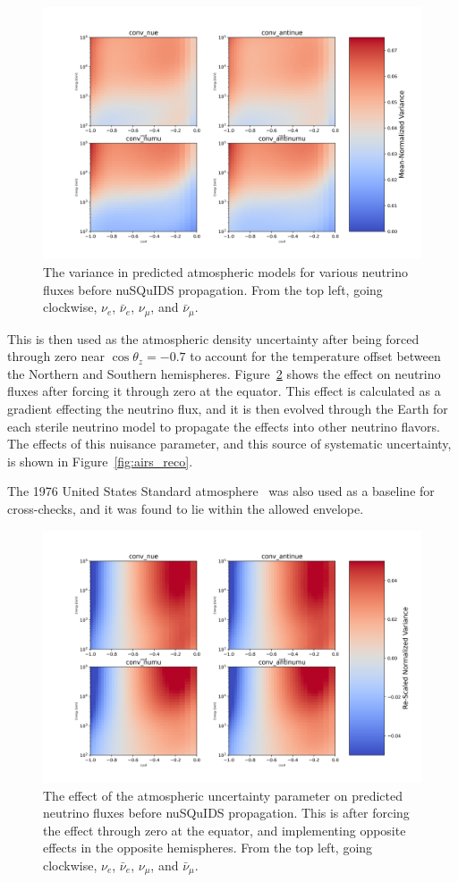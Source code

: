 \documentclass[main.tex]{subfiles}
\begin{document}
\begin{figure}
    \centering
    \includegraphics[width=0.8\linewidth]{figures/airs_grid_var.png}
    \caption{The variance in predicted atmospheric models for various neutrino fluxes before nuSQuIDS propagation. From the top left, going clockwise, $\nu_{e}$, $\bar{\nu}_{e}$, $\nu_{\mu}$, and $\bar{\nu}_{\mu}$. }\label{fig:airs_raw}
\end{figure}

This is then used as the atmospheric density uncertainty after being forced through zero near $\cos\theta_{z}=-0.7$ to account for the temperature offset between the Northern and Southern hemispheres. 
Figure~\ref{fig:airs_grid} shows the effect on neutrino fluxes after forcing it through zero at the equator.
This effect is calculated as a gradient effecting the neutrino flux, and it is then evolved through the Earth for each sterile neutrino model to propagate the effects into other neutrino flavors. 
The effects of this nuisance parameter, and this source of systematic uncertainty, is shown in Figure~\ref{fig:airs_reco}.

The 1976 United States Standard atmosphere~\cite{united1976u} was also used as a baseline for cross-checks, and it was found to lie within the allowed envelope. 

\begin{figure}
    \centering
    \includegraphics[width=0.8\linewidth]{figures/airs_grid.png}
    \caption{The effect of the atmospheric uncertainty parameter on predicted neutrino fluxes before nuSQuIDS propagation. This is after forcing the effect through zero at the equator, and implementing opposite effects in the opposite hemispheres. From the top left, going clockwise, $\nu_{e}$, $\bar{\nu}_{e}$, $\nu_{\mu}$, and $\bar{\nu}_{\mu}$.}\label{fig:airs_grid}
\end{figure}
\end{document}
